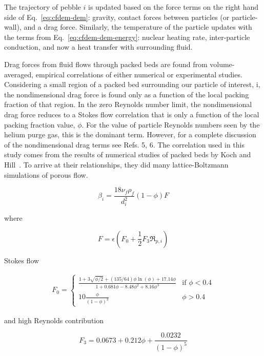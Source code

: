 The trajectory of pebble $i$ is updated based on the force terms on the right hand side of Eq.~\ref{eq:cfdem-dem}: gravity, contact forces between particles (or particle-wall), and a drag force. Similarly, the temperature of the particle updates with the terms from Eq.~\ref{eq:cfdem-dem-energy}: nuclear heating rate, inter-particle conduction, and now a heat transfer with surrounding fluid.

Drag forces from fluid flows through packed beds are found from volume-averaged, empirical correlations of either numerical or experimental studies. Considering a small region of a packed bed surrounding our particle of interest, i, the nondimensional drag force is found only as a function of the local packing fraction of that region. In the zero Reynolds number limit, the nondimensional drag force reduces to a Stokes flow correlation that is only a function of the local packing fraction value, $\phi$. For the value of particle Reynolds numbers seen by the helium purge gas, this is the dominant term. However, for a complete discussion of the nondimensional drag terms see Refs. 5, 6. The correlation used in this study comes from the results of numerical studies of packed beds by Koch and Hill~\cite{Koch2001, Gruber2012, Benyahia2006}. To arrive at their relationships, they did many lattice-Boltzmann simulations of porous flow.

\begin{equation}
	\beta_{i} = \frac{18\nu_f\rho_f}{d_{i}^2}(1-\phi) F
\end{equation}

where 

\begin{equation}
	F = \epsilon (F_0 + \frac{1}{2}F_3 \Re_{p,i})
\end{equation}

Stokes flow

\begin{align}
F_0 = 
	\begin{cases}
    		\frac{1+3\sqrt{\phi/2} + (135/64)\phi\ln(\phi) + 17.14\phi}{1 + 0.681\phi - 8.48\phi^2 + 8.16 \phi^3}	& \text{if } \phi < 0.4\\
    		10\frac{\phi}{(1-\phi)^3}              																& \phi > 0.4
	\end{cases}
\end{align}

and high Reynolds contribution

\begin{equation}
	F_3 = 0.0673 + 0.212\phi + \frac{0.0232}{(1-\phi)^5}
\end{equation}



